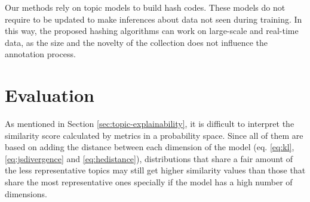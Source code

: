 Our methods rely on topic models to build hash codes. These models do not require to be updated to make inferences about data not seen during training. In this way, the proposed hashing algorithms can work on large-scale and real-time data, as the size and the novelty of the collection does not influence the annotation process.

\section{Evaluation}
\label{sec:comparison-experiments}

As mentioned in Section \ref{sec:topic-explainability}, it is difficult to interpret the similarity score calculated by metrics in a probability space. Since all of them are based on adding the distance between each dimension of the model (eq. \ref{eq:kl}, \ref{eq:jsdivergence} and \ref{eq:hedistance}), distributions that share a fair amount of the less representative topics may still get higher similarity values than those that share the most representative ones specially if the model has a high number of dimensions.

